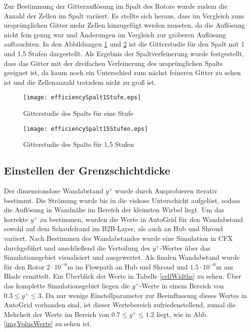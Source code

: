 Zur Bestimmung der Gitterauflösung im Spalt des Rotors wurde zudem die Anzahl der Zellen im Spalt variiert. Es stellte sich heraus, dass im Vergleich zum ursprünglichen Gitter mehr Zellen hinzugefügt werden mussten, da die Auflösung nicht fein genug war und Änderungen im Vergleich zur gröberen Auflösung auftauchten. In den Abbildungen \ref{effSpalt1} und \ref{effSpalt15} ist die Gitterstudie für den Spalt mit 1 und 1,5 Stufen dargestellt. Als Ergebnis der Spaltverfeinerung wurde festgestellt, dass das Gitter mit der dreifachen Verfeinerung des ursprünglichen Spalts geeignet ist, da kaum noch ein Unterschied zum nächst feineren Gitter zu sehen ist und die Zellenanzahl trotzdem nicht zu groß ist.


\begin{figure}[H]
	\centering
	\texttt{[image: efficiencySpalt1Stufe.eps]}
	\caption{Gitterstudie des Spalts für eine Stufe} \label{effSpalt1}
\end{figure}

\begin{figure}[H]
	\centering
	\texttt{[image: efficiencySpalt15Stufen.eps]}
	\caption{Gitterstudie des Spalts für 1,5 Stufen} \label{effSpalt15}
\end{figure}

\subsection{Einstellen der Grenzschichtdicke}
 Der dimensionslose Wandabstand $y^+$ wurde durch Ausprobieren iterativ bestimmt. Die Strömung wurde bis in die viskose Unterschicht aufgelöst, sodass die Auflösung in Wandnähe im Bereich der kleinsten Wirbel liegt. Um das korrekte $y^+$ zu bestimmen, wurden die Werte in AutoGrid für den Wandabstand sowohl auf dem Schaufelrand im B2B-Layer, als auch an Hub und Shroud variiert.  Nach Bestimmen des Wandabstandes wurde eine Simulation in CFX durchgeführt und anschließend die Verteilung des $y^+$-Wertes über das Simulationsgebiet visualisiert und ausgewertet. Als finalen Wandabstand wurde für den Rotor $2\cdot 10^{-6}\text{m}$ im Flowpath an Hub und Shroud und $1.5\cdot 10^{-6}\text{m}$ am Blade ermittelt. Ein Überblick der Werte in Tabelle \ref{cellWidths} zu sehen. Über das komplette Simulationsgebiet liegen die $y^+$-Werte in einem Bereich von $0.3 \leq y^+ \leq 3$. Da nur wenige Einstellparameter zur Beeinflussung dieses Wertes in AutoGrid vorhanden sind, ist dieser Wertebereich zufriedenstellend, zumal die Mehrheit der Werte im Bereich von $0.7 \leq y^+ \leq 1.2$  liegt, wie in Abb. \ref{imgYplusWerte} zu sehen ist. 

